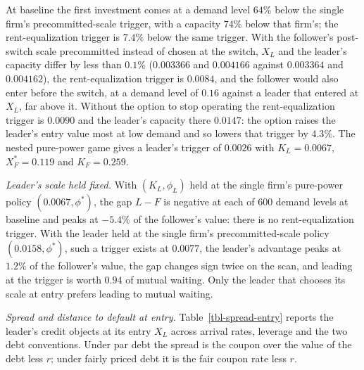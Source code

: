 \documentclass[
  11pt,
  letterpaper,
]{scrartcl}
\begin{document}
At baseline the first investment comes at a demand level \(64\%\) below
the single firm's precommitted-scale trigger, with a capacity \(74\%\)
below that firm's; the rent-equalization trigger is \(7.4\%\) below the
same trigger. With the follower's post-switch scale precommitted instead
of chosen at the switch, \(X_L\) and the leader's capacity differ by
less than \(0.1\%\) (\(0.003366\) and \(0.004166\) against \(0.003364\)
and \(0.004162\)), the rent-equalization trigger is \(0.0084\), and the
follower would also enter before the switch, at a demand level of
\(0.16\) against a leader that entered at \(X_L\), far above it. Without
the option to stop operating the rent-equalization trigger is \(0.0090\)
and the leader's capacity there \(0.0147\): the option raises the
leader's entry value most at low demand and so lowers that trigger by
\(4.3\%\). The nested pure-power game gives a leader's trigger of
\(0.0026\) with \(K_L = 0.0067\), \(X_F^* = 0.119\) and \(K_F = 0.259\).

\emph{Leader's scale held fixed.} With \((K_L, \phi_L)\) held at the
single firm's pure-power policy \((0.0067, \phi^*)\), the gap \(L - F\)
is negative at each of 600 demand levels at baseline and peaks at
\(-5.4\%\) of the follower's value: there is no rent-equalization
trigger. With the leader held at the single firm's precommitted-scale
policy \((0.0158, \phi^*)\), such a trigger exists at \(0.0077\), the
leader's advantage peaks at \(1.2\%\) of the follower's value, the gap
changes sign twice on the scan, and leading at the trigger is worth
\(0.94\) of mutual waiting. Only the leader that chooses its scale at
entry prefers leading to mutual waiting.

\emph{Spread and distance to default at entry.}
Table~\ref{tbl-spread-entry} reports the leader's credit objects at its
entry \(X_L\) across arrival rates, leverage and the two debt
conventions. Under par debt the spread is the coupon over the value of
the debt less \(r\); under fairly priced debt it is the fair coupon rate
less \(r\).
\end{document}
